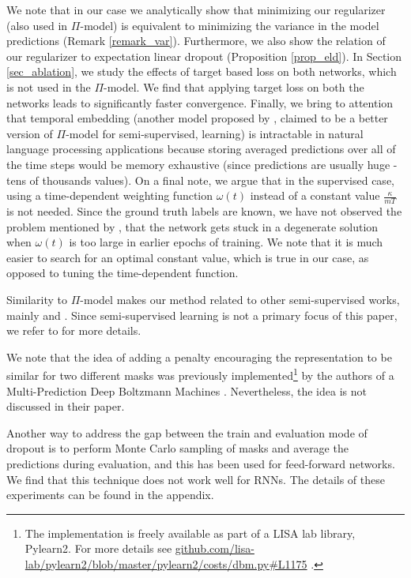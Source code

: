 \documentclass{article} \usepackage{iclr2018_conference,times}
\begin{document}
We note that in our case we analytically show that minimizing our regularizer (also used in $\Pi$-model) is equivalent to minimizing the variance in the model predictions (Remark \ref{remark_var}). Furthermore, we also show the relation of our regularizer to expectation linear dropout (Proposition \ref{prop_eld}). In Section \ref{sec_ablation}, we study the effects of target based loss on both networks, which is not used in the $\Pi$-model. We find that applying target loss on both the networks leads to significantly faster convergence. Finally, we bring to attention that temporal embedding (another model proposed by \citet{laine2016temporal}, claimed to be a better version of $\Pi$-model for semi-supervised, learning) is intractable in natural language processing applications because storing averaged predictions over all of the time steps would be memory exhaustive (since predictions are usually huge - tens of thousands values). On a final note, we argue that in the supervised case, using a time-dependent weighting function $\omega(t)$ instead of a constant value $\frac{\kappa}{mT}$ is not needed. Since the ground truth labels are known, we have not observed the problem mentioned by \citet{laine2016temporal}, that the network gets stuck in a degenerate solution when $\omega(t)$ is too large in earlier epochs of training. We note that it is much easier to search for an optimal constant value, which is true in our case, as opposed to tuning the time-dependent function.

Similarity to $\Pi$-model makes our method related to other semi-supervised works, mainly \cite{ladder} and \cite{sajjadi2016regularization}. Since semi-supervised learning is not a primary focus of this paper, we refer to \cite{laine2016temporal} for more details.

We note that the idea of adding a penalty encouraging the representation to be similar for two different masks was previously implemented\footnote{The implementation is freely available as part of a LISA lab library, Pylearn2. For more details see \url{github.com/lisa-lab/pylearn2/blob/master/pylearn2/costs/dbm.py\#L1175} .} by the authors of a Multi-Prediction Deep Boltzmann Machines \citep{goodfellow2013multi}. Nevertheless, the idea is not discussed in their paper.

Another way to address the gap between the train and evaluation mode of dropout is to perform Monte Carlo sampling of masks and average the predictions during evaluation, and this has been used for feed-forward networks. We find that this technique does not work well for RNNs. The details of these experiments can be found in the appendix. 
\end{document}
